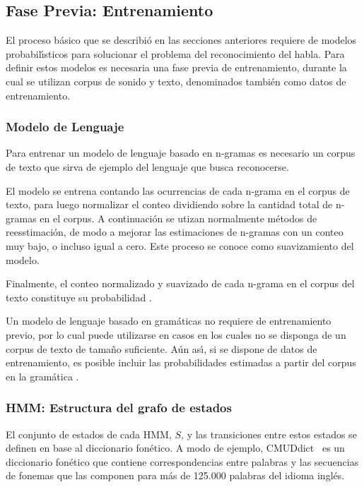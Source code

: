 \subsection{Fase Previa: Entrenamiento}
\label{sec:training}

El proceso b\'asico que se describi\'o en las secciones anteriores requiere de modelos probabil{\'\i}sticos para
solucionar el problema del reconocimiento del habla. Para definir estos modelos es necesaria una
fase previa de entrenamiento, durante la cual se utilizan corpus de sonido y texto, denominados tambi\'en
como datos de entrenamiento.

\subsubsection{Modelo de Lenguaje}

Para entrenar un modelo de lenguaje basado en n-gramas es necesario un corpus de texto que 
sirva de ejemplo del lenguaje que busca reconocerse.

El modelo se entrena contando las ocurrencias de cada n-grama en el corpus de texto, para luego
normalizar el conteo dividiendo sobre la cantidad total de n-gramas en el corpus.
A continuaci\'on se utizan normalmente m\'etodos de reesstimaci\'on, de modo a mejorar las estimaciones 
de n-gramas con un conteo muy bajo, o incluso igual a cero. Este proceso se conoce como suavizamiento
del modelo.

Finalmente, el conteo normalizado y suavizado de cada n-grama en el corpus del texto constituye su
probabilidad \cite{CollinsLanguage}.

Un modelo de lenguaje basado en gram\'aticas no requiere de entrenamiento previo, por lo cual puede
utilizarse en casos en los cuales no se disponga de un corpus de texto de tama\~no suficiente.
A\'un as{\'\i}, si se dispone de datos de entrenamiento, es posible incluir las probabilidades estimadas
a partir del corpus en la gram\'atica \cite{huang-handbook10}.

\subsubsection{HMM: Estructura del grafo de estados}
El conjunto de estados de cada HMM, $S$, y las transiciones entre estos estados se definen en base
al diccionario fon\'etico. A modo de ejemplo, \mbox{CMUDdict \cite{CMUdict}} es un diccionario fon\'etico
que contiene correspondencias entre palabras y las secuencias de fonemas que las componen para m\'as de
125.000 palabras del idioma ingl\'es.

